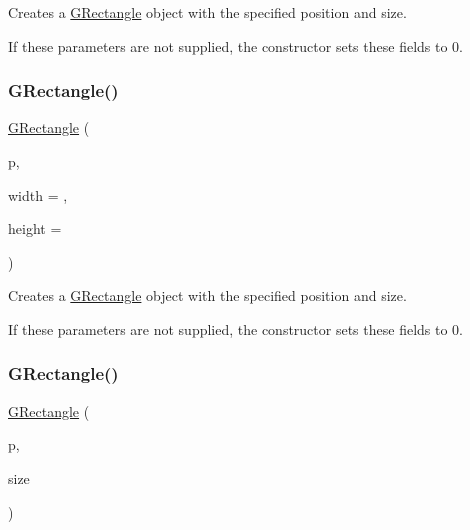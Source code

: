 Creates a {\ttfamily \mbox{\hyperlink{structsgl_1_1GRectangle}{G\+Rectangle}}} object with the specified position and size. 

If these parameters are not supplied, the constructor sets these fields to 0. \mbox{\label{structsgl_1_1GRectangle_a68fa0886a48ee516b8897997c767e504}} 
\subsubsection{\texorpdfstring{G\+Rectangle()}{GRectangle()}\hspace{0.1cm}{\footnotesize\ttfamily [3/4]}}
{\footnotesize\ttfamily \mbox{\hyperlink{structsgl_1_1GRectangle}{G\+Rectangle}} (\begin{DoxyParamCaption}\item[{const \mbox{\hyperlink{structsgl_1_1GPoint}{G\+Point}} \&}]{p,  }\item[{double}]{width = {},  }\item[{double}]{height = {} }\end{DoxyParamCaption})}



Creates a {\ttfamily \mbox{\hyperlink{structsgl_1_1GRectangle}{G\+Rectangle}}} object with the specified position and size. 

If these parameters are not supplied, the constructor sets these fields to 0. \mbox{\label{structsgl_1_1GRectangle_a90356cb96943b1a130aa934f150265a7}} 
\subsubsection{\texorpdfstring{G\+Rectangle()}{GRectangle()}\hspace{0.1cm}{\footnotesize\ttfamily [4/4]}}
{\footnotesize\ttfamily \mbox{\hyperlink{structsgl_1_1GRectangle}{G\+Rectangle}} (\begin{DoxyParamCaption}\item[{const \mbox{\hyperlink{structsgl_1_1GPoint}{G\+Point}} \&}]{p,  }\item[{const \mbox{\hyperlink{structsgl_1_1GDimension}{G\+Dimension}} \&}]{size }\end{DoxyParamCaption})}



